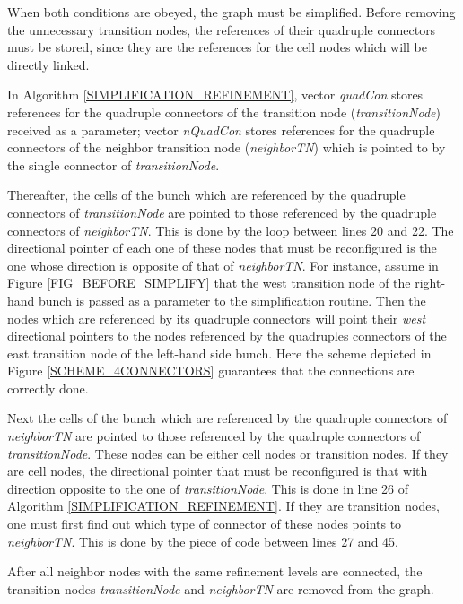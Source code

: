 When both conditions are obeyed, the graph must be simplified.
Before removing the unnecessary transition nodes, the references of
their quadruple connectors must be stored, since they are the
references for the cell nodes which will be directly linked.

In Algorithm \ref{SIMPLIFICATION_REFINEMENT}, vector \textit{quadCon}
stores references for the quadruple connectors of the transition
node (\textit{transitionNode}) received as a parameter; vector
\textit{nQuadCon} stores references for the quadruple connectors of
the neighbor transition node (\textit{neighborTN}) which is pointed
to by the single connector of \textit{transitionNode}.

Thereafter, the cells of the bunch which are referenced by the
quadruple connectors of \textit{transitionNode} are pointed to those
referenced by the quadruple connectors of \textit{neighborTN}. This
is done by the loop between lines 20 and 22. The directional pointer
of each one of these nodes that must be reconfigured is the one
whose direction is opposite of that of \textit{neighborTN}. For
instance, assume in Figure \ref{FIG_BEFORE_SIMPLIFY} that the west
transition node of the right-hand bunch is passed as a parameter to
the simplification routine. Then the nodes which are referenced by
its quadruple connectors will point their \textit{west} directional
pointers to the nodes referenced by the quadruples connectors of the
east transition node of the left-hand side bunch. Here the scheme
depicted in Figure \ref{SCHEME_4CONNECTORS} guarantees that the
connections are correctly done.

Next the cells of the bunch which are referenced by the quadruple
connectors of \textit{neighborTN} are pointed to those referenced by
the quadruple connectors of \textit{transitionNode}. These nodes can
be either cell nodes or transition nodes. If they are cell nodes,
the directional pointer that must be reconfigured is that with
direction opposite to the one of \textit{transitionNode}. This is
done in line 26 of Algorithm \ref{SIMPLIFICATION_REFINEMENT}.
If they are transition nodes, one must first find out which type of
connector of these nodes points to \textit{neighborTN}. This is done
by the piece of code between lines 27 and 45.

After all neighbor nodes with the same refinement levels are
connected, the transition nodes \textit{transitionNode} and
\textit{neighborTN} are removed from the graph.

